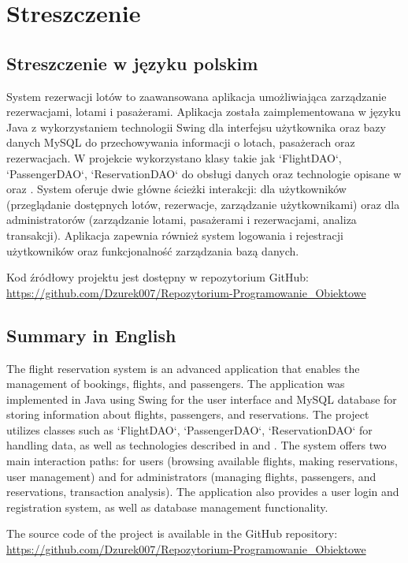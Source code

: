 \section{Streszczenie}
\subsection{Streszczenie w języku polskim}
System rezerwacji lotów to zaawansowana aplikacja umożliwiająca zarządzanie rezerwacjami, lotami i pasażerami. Aplikacja została zaimplementowana w języku Java z wykorzystaniem technologii Swing dla interfejsu użytkownika oraz bazy danych MySQL do przechowywania informacji o lotach, pasażerach oraz rezerwacjach. W projekcie wykorzystano klasy takie jak `FlightDAO`, `PassengerDAO`, `ReservationDAO` do obsługi danych oraz technologie opisane w \cite{w3schools} oraz \cite{sqlite_doc}. System oferuje dwie główne ścieżki interakcji: dla użytkowników (przeglądanie dostępnych lotów, rezerwacje, zarządzanie użytkownikami) oraz dla administratorów (zarządzanie lotami, pasażerami i rezerwacjami, analiza transakcji). Aplikacja zapewnia również system logowania i rejestracji użytkowników oraz funkcjonalność zarządzania bazą danych.

Kod źródłowy projektu jest dostępny w repozytorium GitHub: \url{https://github.com/Dzurek007/Repozytorium-Programowanie_Obiektowe}

\subsection{Summary in English}
The flight reservation system is an advanced application that enables the management of bookings, flights, and passengers. The application was implemented in Java using Swing for the user interface and MySQL database for storing information about flights, passengers, and reservations. The project utilizes classes such as `FlightDAO`, `PassengerDAO`, `ReservationDAO` for handling data, as well as technologies described in \cite{w3schools} and \cite{sqlite_doc}. The system offers two main interaction paths: for users (browsing available flights, making reservations, user management) and for administrators (managing flights, passengers, and reservations, transaction analysis). The application also provides a user login and registration system, as well as database management functionality.

The source code of the project is available in the GitHub repository: \url{https://github.com/Dzurek007/Repozytorium-Programowanie_Obiektowe}